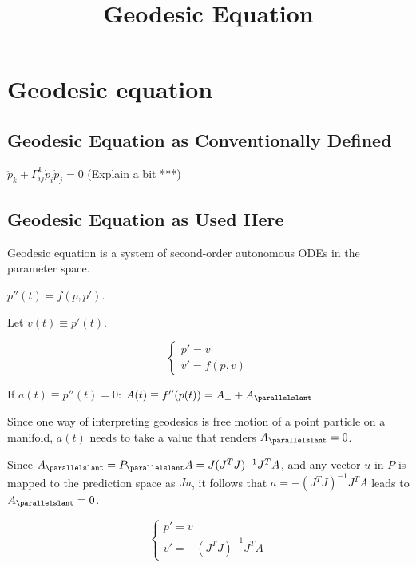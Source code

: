 \documentclass{article}
\title{Geodesic Equation}
\begin{document}
\maketitle

\section{Geodesic equation}
\subsection{Geodesic Equation as Conventionally Defined}
$\ddot{p}_k + \Gamma_{ij}^k \dot{p}_i \dot{p}_j = 0 $ (Explain a bit ***)

\subsection{Geodesic Equation as Used Here}
Geodesic equation is a system of second-order autonomous ODEs in the parameter space. 

$p''(t) = f(p, p')$.

Let $v(t) \equiv p'(t)$.

\begin{equation}
\left    \{
                \begin{array}{ll}
                  p' = v \\
                  v' = f(p, v)
                \end{array}
              \right.
\end{equation}

If $a(t) \equiv p''(t) = 0$:
$A(t) \equiv f''(p(t)) = A_{\perp} + A_{\parallelslant}$ 

Since one way of interpreting geodesics is free motion of a point particle on a manifold, $a(t)$ needs to take a value that renders $A_{\parallelslant}=0$.

Since $A_{\parallelslant} = P_{\parallelslant} A = J (J^T J)^{-1} J^T A$, and any vector $u$ in $P$ is mapped to the prediction space as $J u$, it follows that $a = - (J^T J)^{-1} J^T A$ leads to $A_{\parallelslant}=0$.

\begin{equation}
\left    \{
                \begin{array}{ll}
                  p' = v \\
                  v' = - (J^T J)^{-1} J^T A
                \end{array}
              \right.
\end{equation}
\end{document}
